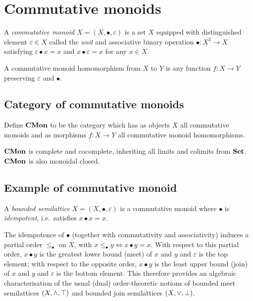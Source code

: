 \section{Commutative monoids}
\label{sec:cmon}

\begin{definition}
A \emph{commutative monoid} $X = (X, \bullet, \varepsilon)$ is a set $X$ equipped with distinguished element
$\varepsilon \in X$ called the \emph{unit} and associative binary operation $\bullet: X^2 \to X$ satisfying
$\varepsilon \bullet x = x$ and $x \bullet \varepsilon = x$ for any $x \in X$.
\end{definition}

A commutative monoid homomorphism from $X$ to $Y$ is any function $f: X \to Y$ preserving $\varepsilon$ and
$\bullet$.

\subsection{Category of commutative monoids}

\begin{definition}
\label{def:cmon:cmon}
Define $\mathbf{CMon}$ to be the category which has as objects $X$ all commutative monoids and as morphisms $f: X \to
Y$ all commutative monoid homomorphisms.
\end{definition}

$\mathbf{CMon}$ is complete and cocomplete, inheriting all limits and colimits from $\mathbf{Set}$. $\mathbf{CMon}$ is also monoidal
closed. 

\subsection{Example of commutative monoid}

\begin{definition}
\label{def:cmon-enriched:bounded-semilattice}
A \emph{bounded semilattice} $X = (X, \bullet, \varepsilon)$ is a commutative monoid where $\bullet$ is
\emph{idempotent}, i.e.~satisfies $x \bullet x = x$.
\end{definition}

\noindent The idempotence of $\bullet$ (together with commutativity and associativity) induces a partial order
$\le_\bullet$ on $X$, with $x \le_{\bullet} y \iff x \bullet y = x$. With respect to this partial order, $x
\bullet y$ is the greatest lower bound (meet) of $x$ and $y$ and $\varepsilon$ is the top element; with
respect to the opposite order, $x \bullet y$ is the least upper bound (join) of $x$ and $y$ and $\varepsilon$
is the bottom element. This therefore provides an algebraic characterisation of the usual (dual)
order-theoretic notions of bounded meet semilattices $(X, \wedge, \top)$ and bounded join semilattices $(X,
\vee, \bot)$.

